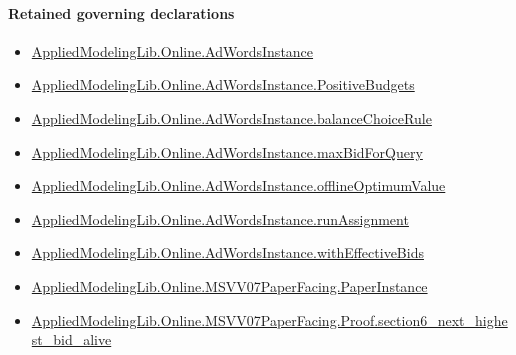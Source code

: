 \documentclass[10pt]{article}
\begin{document}
\paragraph{Retained governing declarations}
\begin{itemize}\raggedright
\item \hyperlink{governing-declaration-e5ce49672bf26ab1}{Applied\allowbreak{}Modeling\allowbreak{}Lib.\allowbreak{}Online.\allowbreak{}Ad\allowbreak{}Words\allowbreak{}Instance}
\item \hyperlink{governing-declaration-eabdcef9dca00922}{Applied\allowbreak{}Modeling\allowbreak{}Lib.\allowbreak{}Online.\allowbreak{}Ad\allowbreak{}Words\allowbreak{}Instance.\allowbreak{}Positive\allowbreak{}Budgets}
\item \hyperlink{governing-declaration-47ab5f144ca5a666}{Applied\allowbreak{}Modeling\allowbreak{}Lib.\allowbreak{}Online.\allowbreak{}Ad\allowbreak{}Words\allowbreak{}Instance.\allowbreak{}balance\allowbreak{}Choice\allowbreak{}Rule}
\item \hyperlink{governing-declaration-af1b7d959c110360}{Applied\allowbreak{}Modeling\allowbreak{}Lib.\allowbreak{}Online.\allowbreak{}Ad\allowbreak{}Words\allowbreak{}Instance.\allowbreak{}max\allowbreak{}Bid\allowbreak{}For\allowbreak{}Query}
\item \hyperlink{governing-declaration-421b6f6fda18a867}{Applied\allowbreak{}Modeling\allowbreak{}Lib.\allowbreak{}Online.\allowbreak{}Ad\allowbreak{}Words\allowbreak{}Instance.\allowbreak{}offline\allowbreak{}Optimum\allowbreak{}Value}
\item \hyperlink{governing-declaration-1878a8a2b3e3182d}{Applied\allowbreak{}Modeling\allowbreak{}Lib.\allowbreak{}Online.\allowbreak{}Ad\allowbreak{}Words\allowbreak{}Instance.\allowbreak{}run\allowbreak{}Assignment}
\item \hyperlink{governing-declaration-5df6277539ea570d}{Applied\allowbreak{}Modeling\allowbreak{}Lib.\allowbreak{}Online.\allowbreak{}Ad\allowbreak{}Words\allowbreak{}Instance.\allowbreak{}with\allowbreak{}Effective\allowbreak{}Bids}
\item \hyperlink{governing-declaration-11907576ec71eeb5}{Applied\allowbreak{}Modeling\allowbreak{}Lib.\allowbreak{}Online.\allowbreak{}MSVV07\allowbreak{}Paper\allowbreak{}Facing.\allowbreak{}Paper\allowbreak{}Instance}
\item \hyperlink{governing-declaration-bdcffcd8cb2a2f3b}{Applied\allowbreak{}Modeling\allowbreak{}Lib.\allowbreak{}Online.\allowbreak{}MSVV07\allowbreak{}Paper\allowbreak{}Facing.\allowbreak{}Proof.\allowbreak{}section6\_\allowbreak{}next\_\allowbreak{}highest\_\allowbreak{}bid\_\allowbreak{}alive}

\end{itemize}
\end{document}

